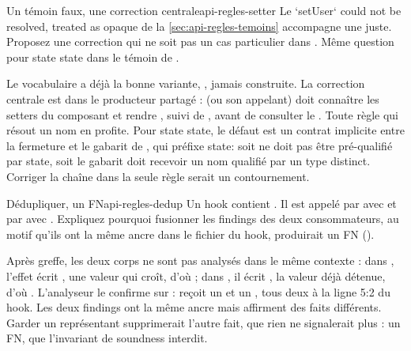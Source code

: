 \begin{exercice}{Un témoin faux, une correction centrale}{api-regles-setter}
Le \Warning{} \og `setUser` could not be resolved, treated as opaque\fg{} de la \cref{sec:api-regles-temoins} accompagne une \Error{} juste. Proposez une correction qui ne soit pas un cas particulier dans . Même question pour \og state state\fg{} dans le témoin de .
\end{exercice}
\begin{solution}
Le vocabulaire a déjà la bonne variante, , jamais construite. La correction centrale est dans le producteur partagé :  (ou son appelant) doit connaître les setters du composant et rendre , suivi de , avant de consulter le . Toute règle qui résout un nom en profite. Pour \og state state\fg, le défaut est un contrat implicite entre la fermeture  et le gabarit de , qui préfixe \og state\fg : soit  ne doit pas être pré-qualifié par \og state\fg, soit le gabarit doit recevoir un nom qualifié par un type distinct. Corriger la chaîne dans la seule règle serait un contournement.
\end{solution}

\begin{exercice}{Dédupliquer, un FN}{api-regles-dedup}
Un hook  contient . Il est appelé par  avec  et par  avec . Expliquez pourquoi fusionner les findings des deux consommateurs, au motif qu'ils ont la même ancre dans le fichier du hook, produirait un FN ().
\end{exercice}
\begin{solution}
Après greffe, les deux corps ne sont pas analysés dans le même contexte : dans , l'effet écrit , une valeur qui croît, d'où  ; dans , il écrit , la valeur déjà détenue, d'où . L'analyseur le confirme sur  :  reçoit un \Warning{}  et  un \Warning{} , tous deux à la ligne 5:2 du hook. Les deux findings ont la même ancre mais affirment des faits différents. Garder un représentant supprimerait l'autre fait, que rien ne signalerait plus : un FN, que l'invariant de soundness interdit.
\end{solution}

